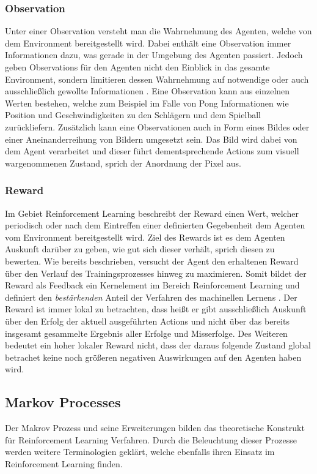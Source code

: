 \documentclass[11pt]{scrartcl}
\begin{document}
\subsubsection{Observation}
Unter einer Observation versteht man die Wahrnehmung des Agenten, welche von dem Environment 
bereitgestellt wird. Dabei enthält eine Observation immer Informationen dazu, was gerade in der
Umgebung des Agenten passiert. Jedoch geben Observations für den Agenten nicht den Einblick
in das gesamte Environment, sondern limitieren dessen Wahrnehmung auf notwendige oder auch
ausschließlich gewollte Informationen \cite[~S.8 f.]{L2018}. Eine Observation kann aus einzelnen
Werten bestehen, welche zum Beispiel im Falle von Pong Informationen wie Position und
Geschwindigkeiten zu den Schlägern und dem Spielball zurückliefern. Zusätzlich kann eine
Observationen auch in Form eines Bildes oder einer Aneinanderreihung von Bildern umgesetzt sein.
Das Bild wird dabei von dem Agent verarbeitet und dieser führt dementsprechende Actions zum
visuell wargenommenen Zustand, sprich der Anordnung der Pixel aus. 


\subsubsection{Reward}
Im Gebiet Reinforcement Learning beschreibt der Reward einen Wert, welcher periodisch oder nach
dem Eintreffen einer definierten Gegebenheit dem Agenten vom Environment bereitgestellt wird.
Ziel des Rewards ist es dem Agenten Auskunft darüber zu geben, wie gut sich dieser verhält, sprich
diesen zu bewerten. Wie bereits beschrieben, versucht der Agent den erhaltenen Reward über den
Verlauf des Trainingsprozesses hinweg zu maximieren. Somit bildet der Reward als Feedback ein
Kernelement im Bereich Reinforcement Learning und definiert den \textit{bestärkenden} Anteil der 
Verfahren des machinellen Lernens \cite[~S.6 f.]{L2018}. Der Reward ist immer lokal zu betrachten,
dass heißt er gibt ausschließlich Auskunft über den Erfolg der aktuell ausgeführten Actions und
nicht über das bereits insgesamt gesammelte Ergebnis aller Erfolge und Misserfolge. Des Weiteren
bedeutet ein hoher lokaler Reward nicht, dass der daraus folgende Zustand global betrachet keine
noch größeren negativen Auswirkungen auf den Agenten haben wird.

\subsection{Markov Processes}
Der Makrov Prozess und seine Erweiterungen bilden das theoretische Konstrukt für Reinforcement Learning
Verfahren. Durch die Beleuchtung dieser Prozesse werden weitere Terminologien geklärt, welche ebenfalls
ihren Einsatz im Reinforcement Learning finden.
\end{document}
